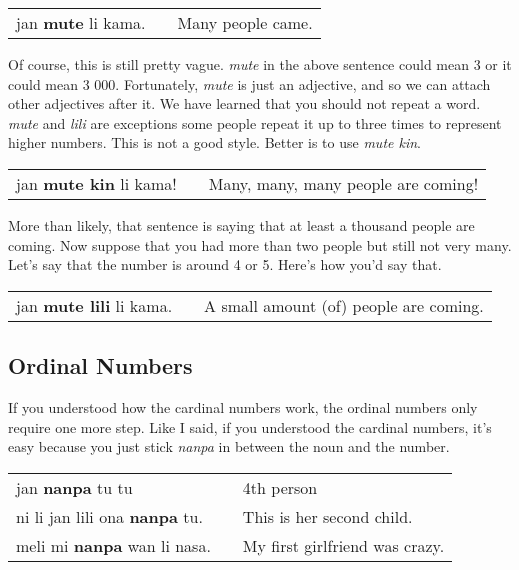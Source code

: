 \begin{supertabular}{p{5,5cm}|ll}
jan \textbf{mute} li kama. && Many people came. \\
\end{supertabular} 

Of course, this is still pretty vague. 
\textit{mute} in the above sentence could mean 3 or it could mean 3 000. 
Fortunately, \textit{mute} is just an adjective, and so we can attach other adjectives after it. 
We have learned that you should not repeat a word. \textit{mute} and \textit{lili} are exceptions some people repeat it up to three times to represent higher numbers. 
This is not a good style. 
Better is to use \textit{mute kin}. 

\begin{supertabular}{p{5,5cm}|ll}
jan \textbf{mute kin} li kama! && Many, many, many people are coming! \\
\end{supertabular} 

More than likely, that sentence is saying that at least a thousand people are coming.  
Now suppose that you had more than two people but still not very many. 
Let's say that the number is around 4 or 5. Here's how you'd say that. 

\begin{supertabular}{p{5,5cm}|ll}
jan \textbf{mute lili} li kama. && A small amount (of) people are coming. \\
\end{supertabular} 
%
\subsection*{Ordinal Numbers}
%
If you understood how the cardinal numbers work, the ordinal numbers only require one more step. 
Like I said, if you understood the cardinal numbers, it's easy because you just stick \textit{nanpa} in between the noun and the number. 

\begin{supertabular}{p{5,5cm}|ll}
jan \textbf{nanpa} tu tu && 4th person \\
ni li jan lili ona \textbf{nanpa} tu. && This is her second child. \\
meli mi \textbf{nanpa} wan li nasa. && My first girlfriend was crazy. \\
\end{supertabular} 
%
